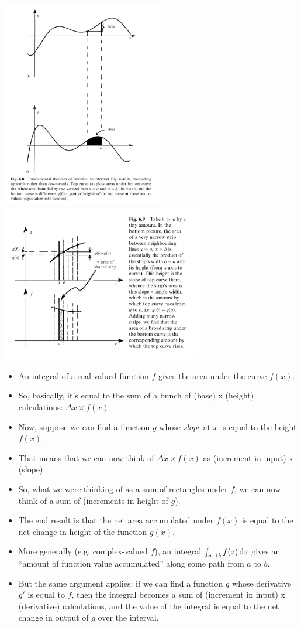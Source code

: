 \begin{mdframed}
  \includegraphics[width=200pt]{img/calculus-ftc-penrose-1.png}
  \includegraphics[width=250pt]{img/calculus-ftc-penrose-2.png}
\end{mdframed}

\begin{itemize}
\item An integral of a real-valued function $f$ gives the area under the curve $f(x)$.
\item So, basically, it's equal to the sum of a bunch of (base) x (height) calculations: $\Delta x \times f(x)$.
\item Now, suppose we can find a function $g$ whose \textit{slope} at $x$ is equal to the height $f(x)$.
\item That means that we can now think of $\Delta x \times f(x)$ as (increment in input) x (slope).
\item So, what we were thinking of as a sum of rectangles under $f$, we can now think of a sum of
  (increments in height of $g$).
\item The end result is that the net area accumulated under $f(x)$ is equal to the net change in height of
  the function $g(x)$.
\item More generally (e.g. complex-valued $f$), an integral $\int_{a \to b} f(z) \dz$ gives an ``amount of
  function value accumulated'' along some path from $a$ to $b$.
\item But the same argument applies: if we can find a function $g$ whose derivative $g'$ is equal to
  $f$, then the integral becomes a sum of (increment in input) x (derivative) calculations, and the
  value of the integral is equal to the net change in output of $g$ over the interval.
\end{itemize}

